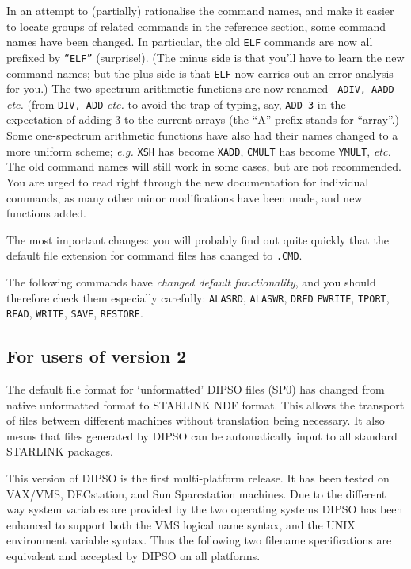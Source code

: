 In an attempt to (partially) rationalise the command names, and make
it easier to locate groups of related commands in the reference
section, some command names have been changed. In particular, the old
{\tt ELF} commands are now all prefixed by {\tt ``ELF''}  (surprise!).
(The minus side is that you'll have to learn the new command names; 
but the plus side is that {\tt ELF} now carries out an error analysis
for you.) The two-spectrum arithmetic functions are now renamed {\tt
ADIV, AADD} {\em etc.} (from {\tt DIV, ADD} {\em etc.} to avoid the
trap of typing, say, {\tt ADD~3} in the expectation of adding 3 to the
current arrays (the ``A'' prefix stands for ``array''.) Some
one-spectrum arithmetic functions have also had their names changed to
a more uniform scheme; {\em e.g.} {\tt XSH} has become {\tt XADD},
{\tt CMULT} has become {\tt YMULT}, {\em etc.} The old command names
will still work in some cases, but are not recommended. You are urged
to read right through the new documentation for individual commands,
as many other minor modifications have been made, and new functions
added.

The most important changes: you will probably find out quite quickly
that the default file extension for command files has changed to 
{\tt .CMD}.

The following commands have {\em changed default functionality}, and
you should therefore check them especially carefully: {\tt ALASRD}, 
{\tt ALASWR}, {\tt  DRED}  {\tt PWRITE},  {\tt TPORT}, {\tt READ}, 
{\tt WRITE}, {\tt SAVE}, {\tt RESTORE}.

\subsection {For users of version 2}

The default file format for `unformatted' DIPSO files (SP0) has
changed from native unformatted format to STARLINK NDF format. This
allows the transport of files between different machines without
translation being necessary. It also means that files generated by
DIPSO can be automatically input to all standard STARLINK packages.

This  version of DIPSO is the first multi-platform release. It has been 
tested on VAX/VMS, DECstation, and Sun Sparcstation machines.
Due to the different way system variables are provided by the two 
operating systems DIPSO has been enhanced to support both the VMS
logical name syntax, and the UNIX environment variable syntax. Thus
the following two filename specifications are equivalent and accepted 
by DIPSO on all platforms.

